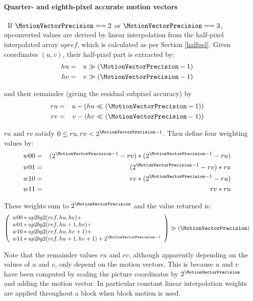 \paragraph{Quarter- and eighth-pixel accurate motion vectors}
$\ $\newline
If $\MotionVectorPrecision==2$ or $\MotionVectorPrecision==3$, upconverted values are derived by linear
interpolation from the half-pixel interpolated array $upref$, which is calculated as 
per Section \ref{halfpel}. Given coordinates $(u,v)$, their half-pixel part
is extracted by:
\begin{eqnarray*}
hu & = & u \gg (\MotionVectorPrecision-1) \\
hv & = & v \gg (\MotionVectorPrecision-1) 
\end{eqnarray*}

and their remainder (giving the residual subpixel accuracy) by
\begin{eqnarray*}
ru & = & u-(hu\ll (\MotionVectorPrecision-1)) \\
rv & = & v-(hv\ll (\MotionVectorPrecision-1)) 
\end{eqnarray*}

$ru$ and $rv$ satisfy $0\leq ru,rv <2^{\MotionVectorPrecision-1}$. Then define four weighting
values by:
\begin{eqnarray*}
w00 & = & (2^{\MotionVectorPrecision-1}-rv)*(2^{\MotionVectorPrecision-1}-ru)\\
w01 & = & (2^{\MotionVectorPrecision-1}-rv)*ru\\
w10 & = & rv*(2^{\MotionVectorPrecision-1}-ru)\\
w11 & = & rv*ru
\end{eqnarray*}

These weights sum to $2^{\MotionVectorPrecision}$ and the value returned is:
\[
\left(
\begin{array}{l}
w00*up2by2(ref,hu,hv)+\\
w01*up2by2(ref,hu+1,hv)+\\
w10*up2by2(ref,hu,hv+1)+\\
w11*up2by2(ref,hu+1,hv+1)+2^{\MotionVectorPrecision-1}
\end{array}
\right)\gg(\MotionVectorPrecision)\]

\begin{informative}
Note that the remainder values $ru$ and $rv$, although apparently depending
on the values of $u$ and $v$, only depend on the motion vectors. This is because
$u$ and $v$ have been computed by scaling the picture coordinates by
$2^{\MotionVectorPrecision}$ and adding the motion vector.
In particular
constant linear interpolation weights are applied throughout a block when
block motion is used.
\end{informative}


